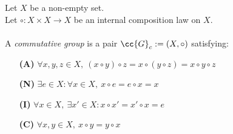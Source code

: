 \begin{definition-pre}
    \label{def:commutative_group}
    Let $X$ be a non-empty set.\\
    Let $\circ: X\times X \to X$ be an internal composition law on $X$. \\\\
    A \textit{commutative group} is a pair $\cc{G}_c:= (X, \circ)$ satisfying:
    \begin{enumerate}
        \item [\textbf{(A)}] $\forall x,y,z\in X,\ (x\circ y)\circ z= x\circ (y\circ z) = x\circ y \circ z$
        \item [\textbf{(N)}] $\exists e \in X : \forall x \in X,\ x\circ e = e \circ x = x$
        \item [\textbf{(I)}] $\forall x \in X,\ \exists x'\in X: x\circ x' = x'\circ x = e$
        \item [\textbf{(C)}] $\forall x,y\in X,\ x\circ y = y\circ x$
    \end{enumerate}
\end{definition-pre}


